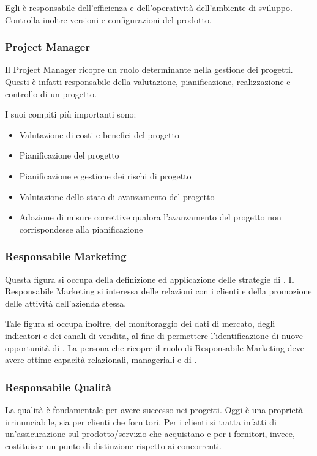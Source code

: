 	Egli è responsabile dell'efficienza e dell'operatività dell'ambiente di sviluppo. Controlla inoltre versioni e configurazioni del prodotto.
	
	\subsubsection{Project Manager}
	Il Project Manager ricopre un ruolo determinante nella gestione dei progetti. Questi è infatti responsabile della valutazione, pianificazione, realizzazione e controllo di un progetto.
	
	I suoi compiti più importanti sono:
	\begin{itemize}
		\item Valutazione di costi e benefici del progetto
		\item Pianificazione del progetto
		\item Pianificazione e gestione dei rischi di progetto
		\item Valutazione dello stato di avanzamento del progetto
		\item Adozione di misure correttive qualora l'avanzamento del progetto non corrispondesse alla pianificazione

	\end{itemize}

\subsubsection{Responsabile Marketing}
	Questa figura si occupa della definizione ed applicazione delle strategie di . Il Responsabile Marketing si interessa delle relazioni con i clienti e della promozione delle attività dell'azienda stessa.
	
	Tale figura si occupa inoltre, del monitoraggio dei dati di mercato, degli indicatori e dei canali di vendita, al fine di permettere l'identificazione di nuove opportunità di \bsn. La persona che ricopre il ruolo di Responsabile Marketing deve avere ottime capacità relazionali, manageriali e di . 
	
\subsubsection{Responsabile Qualità}	
	La qualità è fondamentale per avere successo nei progetti. Oggi è una proprietà irrinunciabile, sia per clienti che fornitori. Per i clienti si tratta infatti di un'assicurazione sul prodotto/servizio che acquistano e per i fornitori, invece, costituisce  un punto di distinzione rispetto ai concorrenti.
	
